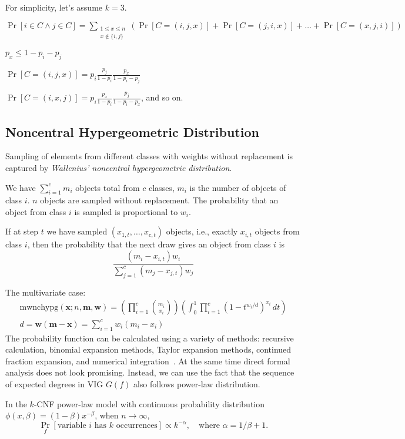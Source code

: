 For simplicity, let's assume $k=3$.

$\Pr[i\in C\land j\in C]=\sum_{\substack{1\leq x\leq n\\x\notin\{i,j\}}}\left(
    \Pr[C=(i,j,x)]+\Pr[C=(j,i,x)]+\ldots+\Pr[C=(x,j,i)]
\right)$

$p_x\leq1-p_i-p_j$

$\Pr[C=(i,j,x)]=p_i\frac{p_j}{1-p_i}\frac{p_x}{1-p_i-p_j}$

$\Pr[C=(i,x,j)]=p_i\frac{p_x}{1-p_i}\frac{p_j}{1-p_i-p_x}$, and so on.

\subsection{Noncentral Hypergeometric Distribution}
Sampling of elements from different classes with weights without replacement
is captured by \textit{Wallenius' noncentral hypergeometric distribution}.

We have $\sum_{i=1}^c{m_i}$ objects total from $c$ classes,
$m_i$ is the number of objects of class $i$.
$n$ objects are sampled without replacement.
The probability that an object from class $i$ is sampled is proportional to $w_i$.

If at step $t$ we have sampled $(x_{1,t},\ldots,x_{c,t})$ objects,
i.e., exactly $x_{i,t}$ objects from class $i$,
then the probability that the next draw gives an object from class $i$ is
\begin{equation}
    \frac{(m_i-x_{i,t})w_i}{\sum_{j=1}^c{(m_j-x_{j,t})w_j}}
\end{equation}

The multivariate case:
\begin{gather}
    \text{mwnchypg}(\mathbf{x};n,\mathbf{m},\mathbf{w})=
    \left(\prod_{i=1}^c{\binom{m_i}{x_i}}\right)
    \left(\int_0^1{\prod_{i=1}^c{(1-t^{w_i/d})^{x_i}}\,dt}\right)\\
    d=\mathbf{w}(\mathbf{m}-\mathbf{x})=\sum_{i=1}^c{w_i(m_i-x_i)}
\end{gather}
The probability function can be calculated using a variety of methods:
recursive calculation, binomial expansion methods,
Taylor expansion methods, continued fraction expansion,
and numerical integration~\cite{fog08}.
At the same time direct formal analysis does not look promising.
Instead, we can use the fact that the sequence of expected degrees
in VIG $G(f)$ also follows power-law distribution.

\begin{theorem}
    In the $k$-CNF power-law model with continuous probability distribution
    $\phi(x,\beta)=(1-\beta)x^{-\beta}$, when $n\to\infty$,
    \begin{equation}
        \Pr_f[\text{variable }i\text{ has }k\text{ occurrences}]\propto k^{-\alpha},
        \quad\text{where }\alpha=1/\beta+1.
    \end{equation}
\end{theorem}

